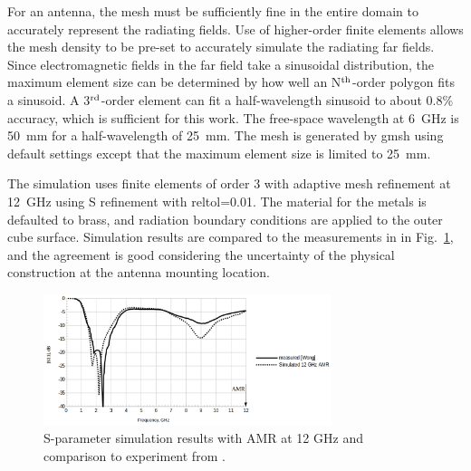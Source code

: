 \documentclass[titlepage]{article}
\renewcommand\_{\textunderscore\linebreak[1]}
\begin{document}
For an antenna, the mesh must be sufficiently fine in the entire domain to accurately represent the radiating fields.  Use of higher-order finite elements allows the mesh density to be pre-set to accurately simulate the radiating far fields.  Since electromagnetic fields in the far field take a sinusoidal distribution, the maximum element size can be determined by how well an N$^{\textnormal{th}}$-order polygon fits a sinusoid.  A 3$^{\textnormal{rd}}$-order element can fit a half-wavelength sinusoid to about 0.8\% accuracy, which is sufficient for this work.  The free-space wavelength at 6~GHz is 50~mm for a half-wavelength of 25~mm.  The mesh is generated by gmsh using default settings except that the maximum element size is limited to 25~mm.

The simulation uses finite elements of order 3 with adaptive mesh refinement at 12~GHz using S refinement with reltol=0.01.  The material for the metals is defaulted to brass, and radiation boundary conditions are applied to the outer cube surface.  Simulation results are compared to the measurements in \cite{Wong} in Fig.~\ref{fig:square_monopole_results}, and the agreement is good considering the uncertainty of the physical construction at the antenna mounting location.
\begin{figure}[H]
  \centering
  \includegraphics[width=0.75\textwidth]{../regression/OpenParEM3D/antenna/square_monopole_study/screenshots/results_12GHz_AMR}
  \caption{S-parameter simulation results with AMR at 12 GHz and comparison to experiment from \cite{Wong}.}
  \label{fig:square_monopole_results}
\end{figure}
\end{document}
